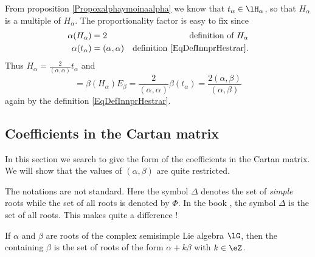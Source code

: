 From proposition \ref{Propoxalphaymoinaalpha} we know that \( t_{\alpha}\in\lH_{\alpha}\), so that \( H_{\alpha}\) is a multiple of \( H_{\alpha}\). The proportionality factor is easy to fix since
\begin{equation}        \label{EqRealsHalpatalphaNorsmd}
    \begin{aligned}[]
        \alpha(H_{\alpha})&=2 &\text{definition of }H_{\alpha}\\
        \alpha(t_{\alpha})&=(\alpha,\alpha) &\text{definition \eqref{EqDefInnprHestrar}}.
    \end{aligned}
\end{equation}
Thus \( H_{\alpha}=\frac{ 2 }{ (\alpha,\alpha) }t_{\alpha}\) and 
\begin{equation}
    [H_{\alpha},E_{\beta}]=\beta(H_{\alpha})E_{\beta}=\frac{ 2 }{ (\alpha,\alpha) }\beta(t_{\alpha})=\frac{ 2(\alpha,\beta) }{ (\alpha,\beta) }
\end{equation}
again by the definition \eqref{EqDefInnprHestrar}.

\subsection{Coefficients in the Cartan matrix}

In this section we search to give the form of the coefficients in the Cartan matrix. We will show that the values of \( (\alpha,\beta)\) are quite restricted.

\begin{remark}
    The notations are not standard. Here the symbol \( \Delta\) denotes the set of \emph{simple} roots while the set of all roots is denoted by \( \Phi\). In the book \cite{Cornwell}, the symbol \( \Delta\) is the set of all roots. This makes quite a difference !
\end{remark}

\begin{definition}
    If \( \alpha\) and \( \beta\) are roots of the complex semisimple Lie algebra \( \lG\), then the  containing \( \beta\) is the set of roots of the form \( \alpha+k\beta\) with \( k\in\eZ\).
\end{definition}

